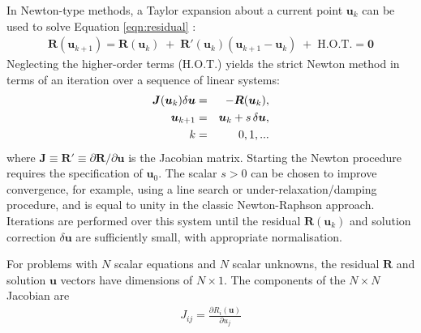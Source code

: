 \documentclass[sn-mathphys,Numbered]{sn-jnl}%
\newcommand{\bb}{\boldsymbol}
\begin{document}
In Newton-type methods, a Taylor expansion about a current point $\bb{u}_k$ can be used to solve Equation \ref{eqn:residual} \cite{Knoll2004}:
\begin{eqnarray}
	\bb{R}(\bb{u}_{k+1}) = \bb{R}(\bb{u}_{k}) \;+\;  \bb{R}'(\bb{u}_{k}) (\bb{u}_{k+1} - \bb{u}_{k}) \;+\; \text{H.O.T.} = \bb{0}
\end{eqnarray}
Neglecting the higher-order terms ($\text{H.O.T.}$) yields the strict Newton method in terms of an iteration over a sequence of linear systems: 
\begin{eqnarray} \label{eq:NewtonRaphson}
	\bb{J}(\bb{u}_k) \delta \bb{u} &=& -\bb{R}(\bb{u}_k), \notag \\
	\bb{u}_{k+1} &=& \bb{u}_k + s \, \delta \bb{u}, \notag \\
	\quad
	k &=& 0,1,...
\end{eqnarray}
where $\bb{J} \equiv \bb{R}' \equiv \partial \bb{R}/\partial \bb{u}$ is the Jacobian matrix.
Starting the Newton procedure requires the specification of $\bb{u}_0$.
The scalar $s > 0$ can be chosen to improve convergence, for example, using a line search or under-relaxation/damping procedure, and is equal to unity in the classic Newton-Raphson approach.
Iterations are performed over this system until the residual $\bb{R}(\bb{u}_k)$ and solution correction $\delta \bb{u}$ are sufficiently small, with appropriate normalisation.


For problems with $N$ scalar equations and $N$ scalar unknowns, the residual $\bb{R}$ and solution $\bb{u}$ vectors have dimensions of $N \times 1$. %
The components of the $N \times N$ Jacobian are
\begin{eqnarray} \label{eq:J}
	{J}_{ij} = \frac{\partial {R}_i (\bb{u})}{\partial u_j}
\end{eqnarray}
\end{document}
